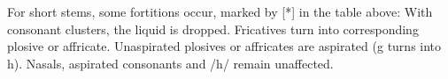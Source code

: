 For short stems, some fortitions occur, marked by [*] in the table above: With consonant clusters, the liquid is dropped. Fricatives turn into corresponding plosive or affricate. Unaspirated plosives or affricates are aspirated (g turns into h). Nasals, aspirated consonants and /h/ remain unaffected.